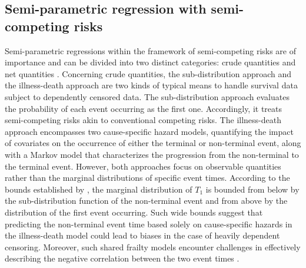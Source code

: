 \documentclass[useAMS,usenatbib,referee]{biom}
\theoremstyle{plain}
\begin{document}

\subsection{Semi-parametric regression with semi-competing risks}
Semi-parametric regressions within the framework of semi-competing risks are of importance and can be divided into two distinct categories: crude quantities and net quantities \citep{varadhan2014}. 
Concerning crude quantities, the sub-distribution approach and the illness-death approach are two kinds of typical means to handle survival data subject to dependently censored data. The sub-distribution approach \citep{fine1999competing,li2014subdistribution} evaluates the probability of each event occurring as the first one. Accordingly, it treats semi-competing risks akin to conventional competing risks. The illness-death approach \citep{xu2010illnessdeath}  encompasses two cause-specific hazard models, quantifying the impact of covariates on the occurrence of either the terminal or non-terminal event, along with a Markov model that characterizes the progression from the non-terminal to the terminal event.
However, both approaches focus on observable quantities rather than the marginal distributions of specific event times.
According to the bounds established by \cite{peterson1976bound}, the marginal distribution of $T_1$ is bounded from below by the sub-distribution function of the non-terminal event and from above by the distribution of the first event occurring. Such wide bounds suggest that predicting the non-terminal event time based solely on cause-specific hazards in the illness-death model could lead to biases in the case of heavily dependent censoring. Moreover, such shared frailty models encounter challenges in effectively describing the negative correlation between the two event times \citep{varadhan2014}. 
\end{document}
